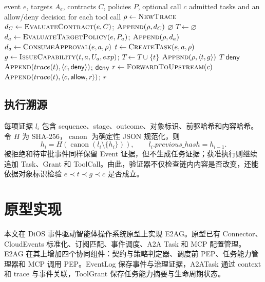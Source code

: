 \begin{algorithm}[H]
\caption{E2AG 跨层能力治理算法}
\label{alg:e2ag-v1}
\begin{algorithmic}[1]
\Require event $e$, targets $A_e$, contracts $C$, policies $P$, optional call $c$
\Ensure admitted tasks and an allow/deny decision for each tool call
  \State $\rho\gets\Call{NewTrace}{}$
  \State $d_C\gets\Call{EvaluateContract}{e,C}$; $\Call{Append}{\rho,d_C}$
    \State \Return $\varnothing$
  \EndIf
  \State $T\gets\varnothing$
    \State $d_a\gets\Call{EvaluateTargetPolicy}{e,P_a}$; $\Call{Append}{\rho,d_a}$
      \State $d_a\gets\Call{ConsumeApproval}{e,a,\rho}$
    \EndIf
      \State $t\gets\Call{CreateTask}{e,a,\rho}$
      \State $g\gets\Call{IssueCapability}{t,a,U_a,exp}$; $T\gets T\cup\{t\}$
      \State $\Call{Append}{\rho,\langle t,g\rangle}$
    \EndIf
  \EndFor
  \State \Return $T$
\EndProcedure
{}
    \State \Return $\mathsf{deny}$
  \EndIf
    \State $\Call{Append}{trace(t),\langle c,\mathsf{deny}\rangle}$; \Return $\mathsf{deny}$
  \EndIf
  \State $r\gets\Call{ForwardToUpstream}{c}$
  \State $\Call{Append}{trace(t),\langle c,\mathsf{allow},r\rangle}$; \Return $r$
\EndProcedure
\end{algorithmic}
\end{algorithm}

\subsection{执行溯源}

每项证据 $l_i$ 包含 sequence、stage、outcome、对象标识、前驱哈希和内容哈希。令 $H$ 为 SHA-256，$\operatorname{canon}$ 为确定性 JSON 规范化，则
\[
h_i=H(\operatorname{canon}(l_i\setminus\{h_i\})),\qquad
l_i.previous\_hash=h_{i-1}.
\]
被拒绝和待审批事件同样保留 Event 证据，但不生成任务证据；获准执行则继续追加 Task、Grant 和 ToolCall。由此，验证器不仅检查链内内容是否改变，还能依据对象标识检验 $e\prec t\prec g\prec c$ 是否成立。

\section{原型实现}\label{sec:implementation-v1}

本文在 DiOS 事件驱动智能体操作系统原型上实现 E2AG。原型已有 Connector、CloudEvents 标准化、订阅匹配、事件调度、A2A Task 和 MCP 配置管理。E2AG 在其上增加四个协同组件：契约与策略判定器、调度前 PEP、任务能力管理器和 MCP 调用 PEP。EventLog 保存事件与治理证据，A2ATask 通过 context 和 trace 与事件关联，ToolGrant 保存任务能力摘要与生命周期状态。

